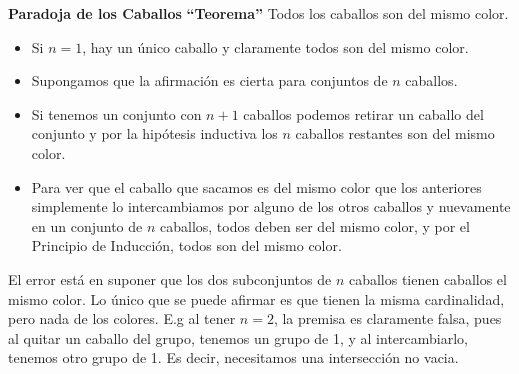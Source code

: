 \documentclass[11pt,a4paper]{article}
\begin{document}
\noindent \textbf{Paradoja de los Caballos}
\textbf{“Teorema”} Todos los caballos son del mismo color.
\begin{itemize}
\item Si $n = 1$, hay un único caballo y claramente todos son del mismo color.
\item Supongamos que la afirmación es cierta para conjuntos de $n$ caballos.
\item Si tenemos un conjunto con $n + 1$ caballos podemos retirar un caballo del conjunto y por la hipótesis inductiva los $n$ caballos restantes son del mismo color.
\item Para ver que el caballo que sacamos es del mismo color que los anteriores simplemente lo intercambiamos por alguno de los otros caballos y nuevamente en un conjunto de $n$ caballos, todos deben ser del mismo color, y por el Principio de Inducción, todos son del mismo color.
\end{itemize}
El error est\'a en suponer que los dos subconjuntos de $n$ caballos tienen caballos el mismo color. Lo \'unico que se puede afirmar es que tienen la misma cardinalidad, pero nada de los colores. E.g al tener $n = 2$, la premisa es claramente falsa, pues al quitar un caballo del grupo, tenemos un grupo de 1, y al intercambiarlo, tenemos otro grupo de 1. Es decir, necesitamos una intersecci\'on no vacia. 
\end{document}

